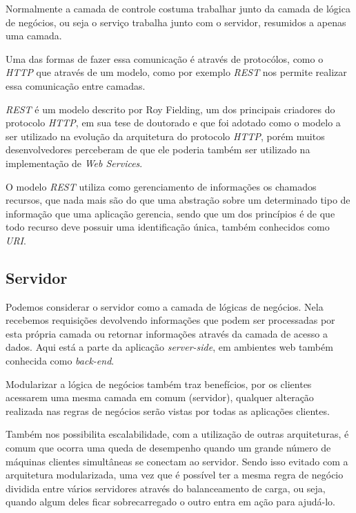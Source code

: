 \documentclass[
	12pt,				%
	openright,			%
	twoside,			%
	a4paper,			%
	english,			%
	brazil				%
	]{abntex2}
\begin{document}
Normalmente a camada de controle costuma trabalhar junto da camada de lógica de negócios, ou seja o serviço trabalha junto com o servidor, resumidos a apenas uma camada.

Uma das formas de fazer essa comunicação é através de protocólos, como o \textit{HTTP} que através de um modelo, como por exemplo \textit{REST} nos permite realizar essa comunicação entre camadas.

\textit{REST} é um modelo descrito por Roy Fielding, um dos principais criadores do protocolo \textit{HTTP}, em sua tese de doutorado e que foi adotado como o modelo a ser utilizado na evolução da arquitetura do protocolo \textit{HTTP}, porém muitos desenvolvedores perceberam de que ele poderia também ser utilizado na implementação de \textit{Web Services}.

O modelo \textit{REST} utiliza como gerenciamento de informações os chamados recursos, que nada mais são do que uma abstração sobre um determinado tipo de informação que uma aplicação gerencia, sendo que um dos princípios é de que todo recurso deve possuir uma identificação única, também conhecidos como \textit{URI}.

\subsection{Servidor}
\label{subsec:Servidor}

Podemos considerar o servidor como a camada de lógicas de negócios. Nela recebemos requisições devolvendo informações que podem ser processadas por esta própria camada ou retornar informações através da camada de acesso a dados. Aqui está a parte da aplicação \textit{server-side}, em ambientes web também conhecida como \textit{back-end}.

Modularizar a lógica de negócios também traz benefícios, por os clientes acessarem uma mesma camada em comum (servidor), qualquer alteração realizada nas regras de negócios serão vistas por todas as aplicações clientes.

Também nos possibilita escalabilidade, com a utilização de outras arquiteturas, é comum que ocorra uma queda de desempenho quando um grande número de máquinas clientes simultâneas se conectam ao servidor. Sendo isso evitado com a arquitetura modularizada, uma vez que é possível ter a mesma regra de negócio dividida entre vários servidores através do balanceamento de carga, ou seja, quando algum deles ficar sobrecarregado o outro entra em ação para ajudá-lo. 
\end{document}
